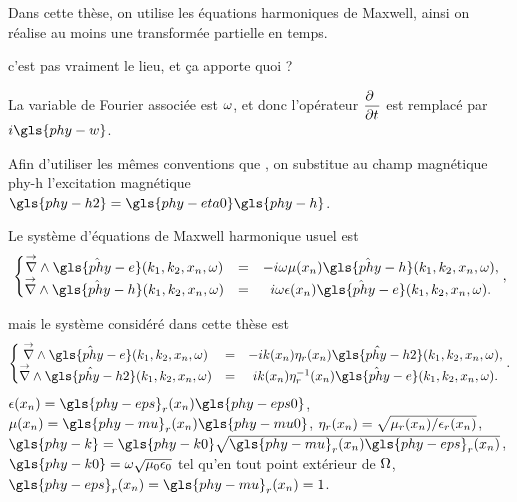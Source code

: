 Dans cette thèse, on utilise les équations harmoniques de Maxwell, ainsi on réalise au moins une transformée partielle en temps.
\begin{REM}
  c'est pas vraiment le lieu, et ça apporte quoi ?
\end{REM} La variable de Fourier associée est \(\w\), et donc l'opérateur \(\ddr{t}{~}\) est remplacé par \(i\gls{phy-w}\).

Afin d'utiliser les mêmes conventions que \cite{stupfel_implementation_2015}, on substitue au champ magnétique \gls{phy-h} l’excitation magnétique \(\gls{phy-h2} = \gls{phy-eta0} \gls{phy-h}\).

Le système d'équations de Maxwell harmonique usuel est
\begin{equation}
    \left\lbrace
    \begin{matrix}
    \vrot \hat{\gls{phy-e}}(k_1,k_2,x_n,\w)  &=& -i \omega \mu(x_n) \hat{\gls{phy-h}}(k_1,k_2,x_n,\w),
    \\
    \vrot \hat{\gls{phy-h}}(k_1,k_2,x_n,\w)  &=& i \omega \eps(x_n) \hat{\gls{phy-e}}(k_1,k_2,x_n,\w).
    \end{matrix}
    \right.,
    \label{eq:imp_fourier:intro:maxwell_harmonique}
\end{equation}

mais le système considéré dans cette thèse est
\begin{equation}
    \left\lbrace
    \begin{matrix}
    \vrot \hat{\gls{phy-e}}(k_1,k_2,x_n,\w)  &=& -i k(x_n) \eta_r(x_n) \hat{\gls{phy-h2}}(k_1,k_2,x_n,\w),  \\
    \vrot \hat{\gls{phy-h2}}(k_1,k_2,x_n,\w)  &=& i k(x_n) \eta_r^{-1}(x_n) \hat{\gls{phy-e}}(k_1,k_2,x_n,\w).
    \end{matrix}
    \right..
    \label{eq:imp_fourier:intro:maxwell_harmonique:form_cea}
\end{equation}
\(\eps(x_n)=\gls{phy-eps}_r(x_n)\gls{phy-eps0}\), \(\mu(x_n)=\gls{phy-mu}_r(x_n)\gls{phy-mu0}\), \(\eta_r(x_n)=\sqrt{\mu_r(x_n)/\eps_r(x_n)}\), \(\gls{phy-k}=\gls{phy-k0}\sqrt{\gls{phy-mu}_r(x_n)\gls{phy-eps}_r(x_n)}\), \(\gls{phy-k0} = \w\sqrt{\mu_0\eps_0}\) tel qu'en tout point extérieur de \(\OO\), \(\gls{phy-eps}_r(x_n) = \gls{phy-mu}_r(x_n)= 1\).

